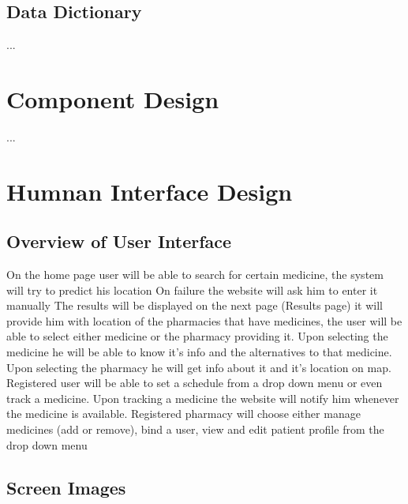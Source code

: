 \documentclass[]{article}
\begin{document}
\subsection {Data Dictionary}
...

\section{Component Design}
...


\section{Humnan Interface Design}

\subsection {Overview of User Interface}
On the home page user will be able to search for certain medicine, the system will try to predict his location
\newline
On failure the website will ask him to enter it manually
\newline
The results will be displayed on the next page (Results page) it will provide him with location of the pharmacies that have medicines, the user will be able to select either medicine or the pharmacy providing it.
\newline
Upon selecting the medicine he will be able to know it's info and the alternatives to that medicine.
\newline
Upon selecting the pharmacy he will get info about it and it's location on map.
\newline
\newline
Registered user will be able to set a schedule from a drop down menu or even track a medicine.
\newline
Upon tracking a medicine the website will notify him whenever the medicine is available.
\newline
\newline
Registered pharmacy will choose either manage medicines (add or remove), bind a user, view and edit patient profile from the drop down menu
\newline

\subsection {Screen Images}
\end{document}
